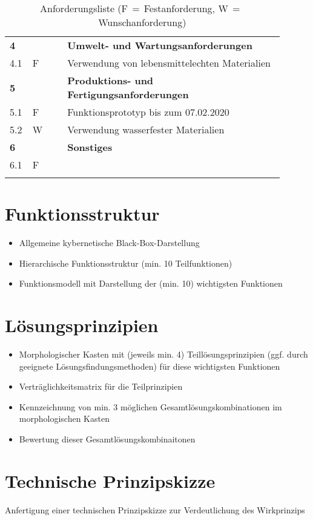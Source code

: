 \begin{longtable}{C{0.05\linewidth}C{0.05\linewidth}C{0.05\linewidth}L{0.75\linewidth}}
	\midrule 
	
	\textbf{4} & & & \textbf{Umwelt- und Wartungsanforderungen} \\
	4.1 & F & & Verwendung von lebensmittelechten Materialien \\
	
	\midrule
	
	\textbf{5} & & & \textbf{Produktions- und Fertigungsanforderungen} \\
	5.1 & F & & Funktionsprototyp bis zum 07.02.2020 \\
	5.2 & W & & Verwendung wasserfester Materialien \\
	
	\midrule
	
	\textbf{6} & & & \textbf{Sonstiges} \\
	6.1 & F & & \\
	
	\bottomrule
	
	\caption{Anforderungsliste (F$\,=\,$Festanforderung, W$\,=\,$Wunschanforderung)}
	\label{anforderungsliste}
\end{longtable}


\section{Funktionsstruktur}

\begin{itemize}
	\item Allgemeine kybernetische Black-Box-Darstellung
	\item Hierarchische Funktionsstruktur (min. 10 Teilfunktionen)
	\item Funktionsmodell mit Darstellung der (min. 10) wichtigsten Funktionen
\end{itemize}


\section{Lösungsprinzipien}

\begin{itemize}
	\item Morphologischer Kasten mit (jeweils min. 4) Teillösungsprinzipien (ggf. durch geeignete Lösungsfindungsmethoden) für diese wichtigsten Funktionen
	\item Verträglichkeitsmatrix für die Teilprinzipien
	\item Kennzeichnung von min. 3 möglichen Gesamtlösungskombinationen im morphologischen Kasten
	\item Bewertung dieser Gesamtlösungskombinaitonen
\end{itemize}

\section{Technische Prinzipskizze}

Anfertigung einer technischen Prinzipskizze zur Verdeutlichung des Wirkprinzips